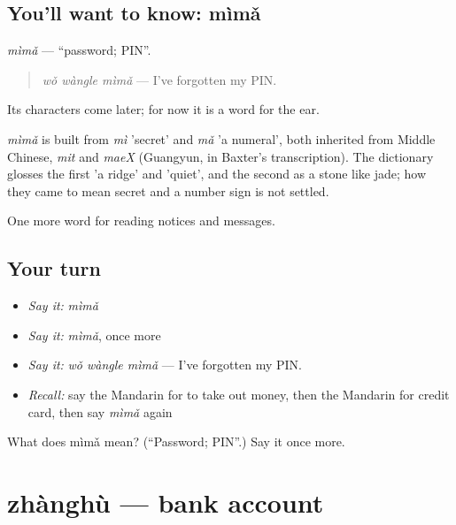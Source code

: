 \subsection*{You'll want to know: mìmǎ}
\emph{mìmǎ} — \textquotedblleft{}password; PIN\textquotedblright{}.

\begin{quote}
\emph{wǒ wàngle mìmǎ} — I've forgotten my PIN.
\end{quote}

Its characters come later; for now it is a word for the ear.

\begin{cousinweb}
\emph{mìmǎ} is built from \emph{mì} 'secret' and \emph{mǎ} 'a numeral', both inherited from Middle Chinese, \emph{mit} and \emph{maeX} (Guangyun, in Baxter's transcription). The dictionary glosses the first 'a ridge' and 'quiet', and the second as a stone like jade; how they came to mean secret and a number sign is not settled.
\end{cousinweb}

\begin{grammarlens}[title={What you've built}]
One more word for reading notices and messages.
\end{grammarlens}

\subsection*{Your turn}
\begin{itemize}
\raggedright
  \item \emph{Say it:} \emph{mìmǎ}
  \item \emph{Say it:} \emph{mìmǎ}, once more
  \item \emph{Say it:} \emph{wǒ wàngle mìmǎ} — I've forgotten my PIN.
  \item \emph{Recall:} say the Mandarin for to take out money, then the Mandarin for credit card, then say \emph{mìmǎ} again
\end{itemize}

\begin{tcolorbox}[breakable,colback=teal!4,colframe=teal!35!black,title={Before you move on}]
What does mìmǎ mean? (\textquotedblleft{}Password; PIN\textquotedblright{}.) Say it once more.
\end{tcolorbox}
\section[zhànghù]{zhànghù — bank account}

